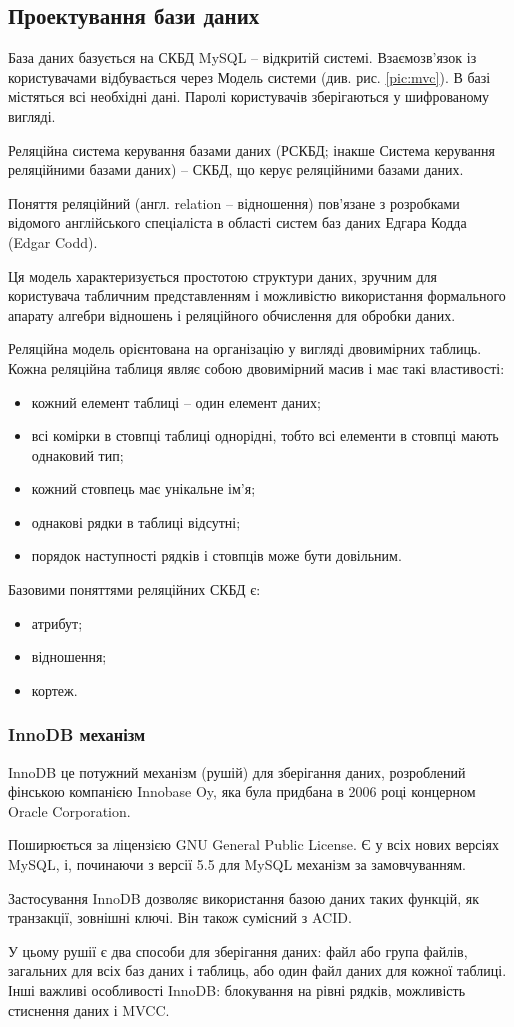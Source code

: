 \subsection{Проектування бази даних}
База даних базується на СКБД MySQL -- відкритій системі. Взаємозв'язок із користувачами відбувається через Модель системи (див. рис. \ref{pic:mvc}). В базі містяться всі необхідні дані. Паролі користувачів зберігаються у шифрованому вигляді.
\par Реляційна система керування базами даних (РСКБД; інакше Система керування реляційними базами даних) -- СКБД, що керує реляційними базами даних.
\par Поняття реляційний (англ. relation -- відношення) пов'язане з розробками відомого англійського спеціаліста в області систем баз даних Едгара Кодда (Edgar Codd).
\par Ця модель характеризується простотою структури даних, зручним для користувача табличним представленням і можливістю використання формального апарату алгебри відношень і реляційного обчислення для обробки даних.
\par Реляційна модель орієнтована на організацію у вигляді двовимірних таблиць. Кожна реляційна таблиця являє собою двовимірний масив і має такі властивості:
\begin{itemize}
	\item кожний елемент таблиці -- один елемент даних;
	\item всі комірки в стовпці таблиці однорідні, тобто всі елементи в стовпці мають однаковий тип;
	\item кожний стовпець має унікальне ім'я;
	\item однакові рядки в таблиці відсутні;
	\item порядок наступності рядків і стовпців може бути довільним.
\end{itemize}
Базовими поняттями реляційних СКБД є:
\begin{itemize}
	\item атрибут;
	\item відношення;
	\item кортеж.
\end{itemize}

\subsubsection{InnoDB механізм}
\par InnoDB це потужний механізм (рушій) для зберігання даних, розроблений фінською компанією Innobase Oy, яка була придбана в 2006 році концерном Oracle Corporation.
\par Поширюється за ліцензією GNU General Public License. Є у всіх нових версіях MySQL, і, починаючи з версії 5.5 для MySQL механізм за замовчуванням.
\par Застосування InnoDB дозволяє використання базою даних таких функцій, як транзакції, зовнішні ключі. Він також сумісний з ACID.
\par У цьому рушії є два способи для зберігання даних: файл або група файлів, загальних для всіх баз даних і таблиць, або один файл даних для кожної таблиці. Інші важливі особливості InnoDB: блокування на рівні рядків, можливість стиснення даних і MVCC.

